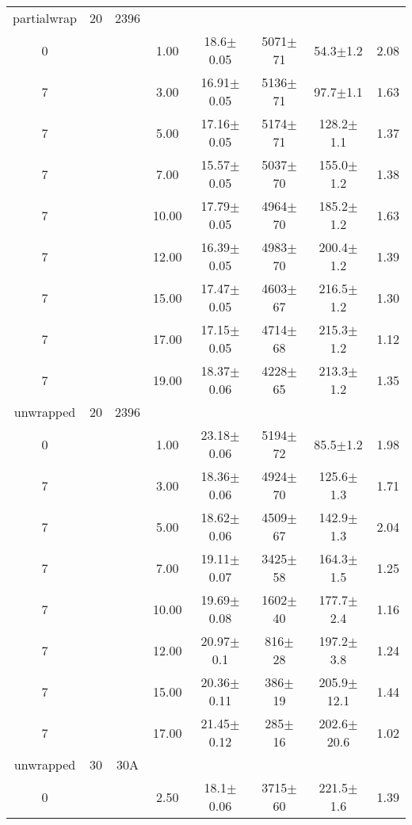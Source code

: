 \begin{tabular}{ccccccc}
partialwrap & 20 & 2396 &   &   &   &   & \\
0
 &  &  &       1.00 &    18.6$\pm$0.05 &  5071$\pm$71 &   54.3$\pm$1.2 &        2.08 \\
7
 &  &  &       3.00 &   16.91$\pm$0.05 &  5136$\pm$71 &   97.7$\pm$1.1 &        1.63 \\
7
 &  &  &       5.00 &   17.16$\pm$0.05 &  5174$\pm$71 &  128.2$\pm$1.1 &        1.37 \\
7
 &  &  &       7.00 &   15.57$\pm$0.05 &  5037$\pm$70 &  155.0$\pm$1.2 &        1.38 \\
7
 &  &  &      10.00 &   17.79$\pm$0.05 &  4964$\pm$70 &  185.2$\pm$1.2 &        1.63 \\
7
 &  &  &      12.00 &   16.39$\pm$0.05 &  4983$\pm$70 &  200.4$\pm$1.2 &        1.39 \\
7
 &  &  &      15.00 &   17.47$\pm$0.05 &  4603$\pm$67 &  216.5$\pm$1.2 &        1.30 \\
7
 &  &  &      17.00 &   17.15$\pm$0.05 &  4714$\pm$68 &  215.3$\pm$1.2 &        1.12 \\
7
 &  &  &      19.00 &   18.37$\pm$0.06 &  4228$\pm$65 &  213.3$\pm$1.2 &        1.35 \\
unwrapped & 20 & 2396 &   &   &   &   & \\
0
 &  &  &       1.00 &   23.18$\pm$0.06 &  5194$\pm$72 &    85.5$\pm$1.2 &        1.98 \\
7
 &  &  &       3.00 &   18.36$\pm$0.06 &  4924$\pm$70 &   125.6$\pm$1.3 &        1.71 \\
7
 &  &  &       5.00 &   18.62$\pm$0.06 &  4509$\pm$67 &   142.9$\pm$1.3 &        2.04 \\
7
 &  &  &       7.00 &   19.11$\pm$0.07 &  3425$\pm$58 &   164.3$\pm$1.5 &        1.25 \\
7
 &  &  &      10.00 &   19.69$\pm$0.08 &  1602$\pm$40 &   177.7$\pm$2.4 &        1.16 \\
7
 &  &  &      12.00 &    20.97$\pm$0.1 &   816$\pm$28 &   197.2$\pm$3.8 &        1.24 \\
7
 &  &  &      15.00 &   20.36$\pm$0.11 &   386$\pm$19 &  205.9$\pm$12.1 &        1.44 \\
7
 &  &  &      17.00 &   21.45$\pm$0.12 &   285$\pm$16 &  202.6$\pm$20.6 &        1.02 \\
unwrapped & 30 & 30A &   &   &   &   & \\
0
 &  &  &       2.50 &    18.1$\pm$0.06 &  3715$\pm$60 &  221.5$\pm$1.6 &        1.39 \\

\end{tabular}
